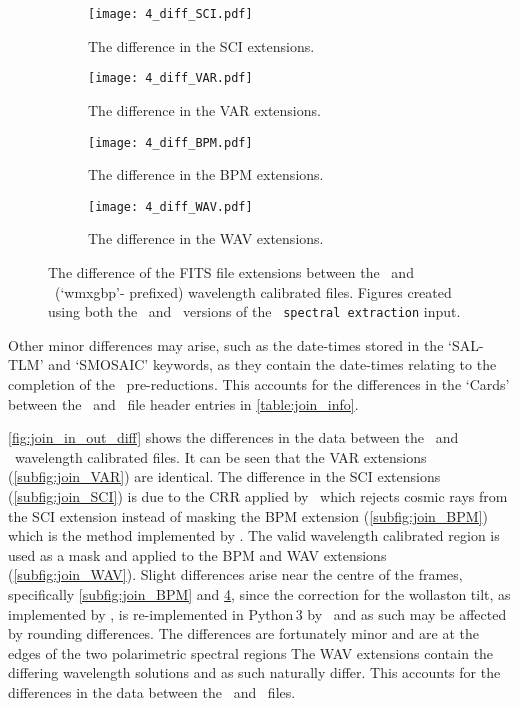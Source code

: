 \begin{figure}
    \centering
    \begin{subfigure}[b]{\textwidth}
        \centering
        \texttt{[image: 4\_diff\_SCI.pdf]}
        \caption{The difference in the \gls{SCI} extensions.}
        \label{subfig:join_SCI}
    \end{subfigure}
    \hfill
    \begin{subfigure}[b]{\textwidth}
        \centering
        \texttt{[image: 4\_diff\_VAR.pdf]}
        \caption{The difference in the \gls{VAR} extensions.}
        \label{subfig:join_VAR}
    \end{subfigure}
    \hfill
    \begin{subfigure}[b]{\textwidth}
        \centering
        \texttt{[image: 4\_diff\_BPM.pdf]}
        \caption{The difference in the \gls{BPM} extensions.}
        \label{subfig:join_BPM}
    \end{subfigure}
    \hfill
    \begin{subfigure}[b]{\textwidth}
        \centering
        \texttt{[image: 4\_diff\_WAV.pdf]}
        \caption{The difference in the \gls{WAV} extensions.}
        \label{subfig:join_WAV}
    \end{subfigure}
    \caption{
        The difference of the \gls{FITS} file extensions between the \polsalt\ and \stops\ (`wmxgbp'- prefixed) wavelength calibrated files.
        Figures created using both the \polsalt\ and \stops\ versions of the \polsalt\ \texttt{spectral extraction} input.
    }
    \label{fig:join_in_out_diff}
\end{figure}

Other minor differences may arise, such as the date-times stored in the `SAL-TLM' and `SMOSAIC' keywords, as they contain the date-times relating to the completion of the \polsalt\ pre-reductions.
This accounts for the differences in the `Cards' between the \polsalt\ and \stops\ file header entries in \autoref{table:join_info}.

\autoref{fig:join_in_out_diff} shows the differences in the data between the \polsalt\ and \stops\ wavelength calibrated files.
It can be seen that the \gls{VAR} extensions (\autoref{subfig:join_VAR}) are identical.
The difference in the \gls{SCI} extensions (\autoref{subfig:join_SCI}) is due to the \gls{CRR} applied by \stops\, which rejects cosmic rays from the \gls{SCI} extension instead of masking the \gls{BPM} extension (\autoref{subfig:join_BPM}) which is the method implemented by \polsalt.
The valid wavelength calibrated region is used as a mask and applied to the \gls{BPM} and \gls{WAV} extensions (\autoref{subfig:join_WAV}).
Slight differences arise near the centre of the frames, specifically \autoref{subfig:join_BPM} and \ref{subfig:join_WAV}, since the correction for the wollaston tilt, as implemented by \polsalt, is re-implemented in Python\,$3$ by \stops\ and as such may be affected by rounding differences.
The differences are fortunately minor and are at the edges of the two polarimetric spectral regions
The \gls{WAV} extensions contain the differing wavelength solutions and as such naturally differ.
This accounts for the differences in the data between the \polsalt\ and \stops\ files.

